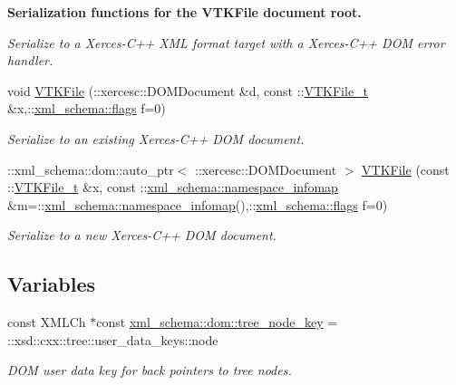 \begin{Indent}{\bf Serialization functions for the V\+T\+K\+File document root.}
\begin{DoxyCompactItemize}
\begin{DoxyCompactList}\small\item\em Serialize to a Xerces-\/\+C++ X\+M\+L format target with a Xerces-\/\+C++ D\+O\+M error handler. \end{DoxyCompactList}\item 
void \hyperlink{vtk-unstructured_8h_a565e24ae1c887b385f78f07e149688fc}{V\+T\+K\+File} (\+::xercesc\+::\+D\+O\+M\+Document \&d, const \+::\hyperlink{classVTKFile__t}{V\+T\+K\+File\+\_\+t} \&x,\+::\hyperlink{namespacexml__schema_a8d981c127a1f5106d04ad5853e707361}{xml\+\_\+schema\+::flags} f=0)
\begin{DoxyCompactList}\small\item\em Serialize to an existing Xerces-\/\+C++ D\+O\+M document. \end{DoxyCompactList}\item 
\+::xml\+\_\+schema\+::dom\+::auto\+\_\+ptr$<$ \+::xercesc\+::\+D\+O\+M\+Document $>$ \hyperlink{vtk-unstructured_8h_a1e13b8cfd8e9321c56a75ae2414b6f34}{V\+T\+K\+File} (const \+::\hyperlink{classVTKFile__t}{V\+T\+K\+File\+\_\+t} \&x, const \+::\hyperlink{namespacexml__schema_ad52b6e3505153cb30ba3452f7868450e}{xml\+\_\+schema\+::namespace\+\_\+infomap} \&m=\+::\hyperlink{namespacexml__schema_ad52b6e3505153cb30ba3452f7868450e}{xml\+\_\+schema\+::namespace\+\_\+infomap}(),\+::\hyperlink{namespacexml__schema_a8d981c127a1f5106d04ad5853e707361}{xml\+\_\+schema\+::flags} f=0)
\begin{DoxyCompactList}\small\item\em Serialize to a new Xerces-\/\+C++ D\+O\+M document. \end{DoxyCompactList}\end{DoxyCompactItemize}
\end{Indent}
\subsection*{Variables}
\begin{DoxyCompactItemize}
\item 
const X\+M\+L\+Ch $\ast$const \hyperlink{namespacexml__schema_1_1dom_a040aaf412668d9e7a7854001c703446a}{xml\+\_\+schema\+::dom\+::tree\+\_\+node\+\_\+key} = \+::xsd\+::cxx\+::tree\+::user\+\_\+data\+\_\+keys\+::node
\begin{DoxyCompactList}\small\item\em D\+O\+M user data key for back pointers to tree nodes. \end{DoxyCompactList}\end{DoxyCompactItemize}


